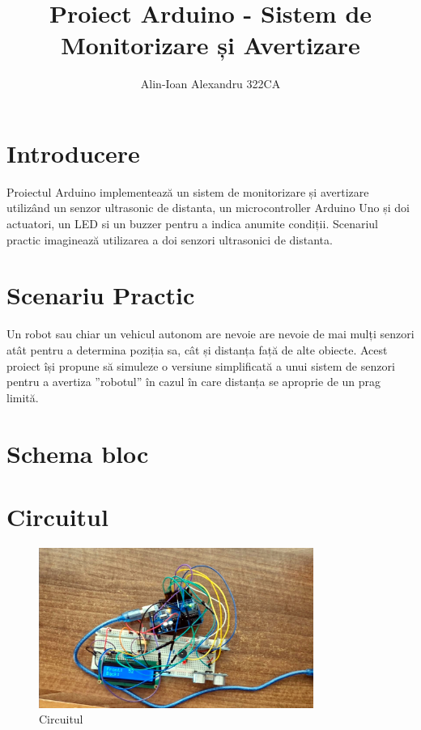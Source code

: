 \documentclass{article}
\title{Proiect Arduino - Sistem de Monitorizare și Avertizare}
\author{Alin-Ioan Alexandru 322CA}
\date{}
\begin{document}
\maketitle

\section{Introducere}
Proiectul Arduino implementează un sistem de monitorizare și avertizare utilizând un senzor ultrasonic de distanta, un microcontroller Arduino Uno și doi actuatori, un LED si un buzzer pentru a indica anumite condiții. Scenariul practic imaginează utilizarea a doi senzori ultrasonici de distanta.

\section{Scenariu Practic}
Un robot sau chiar un vehicul autonom are nevoie are nevoie de mai mulți senzori atât pentru a determina poziția sa, cât și distanța față de alte obiecte. Acest proiect își propune să simuleze o versiune simplificată a unui sistem de senzori pentru a avertiza ”robotul” în cazul în care distanța se aproprie de un prag limită.

\section{Schema bloc}



\section{Circuitul}

\begin{figure}[h]
    \centering
    \includegraphics[width=0.8\textwidth]{circuit.jpeg}
    \caption{Circuitul}
\end{figure}
\end{document}
